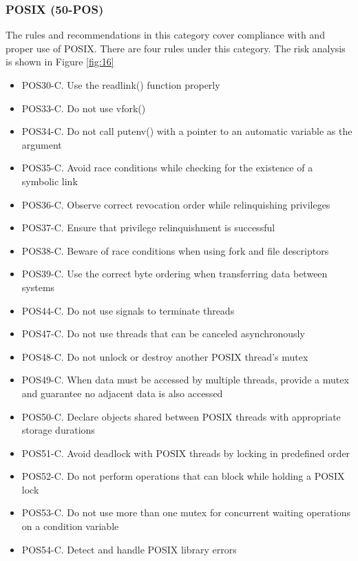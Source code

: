 \subsubsection{POSIX (50-POS)} The rules and recommendations in this category cover compliance with and proper use of POSIX. There are four rules under this category. The risk analysis is shown in Figure \ref{fig:16}\cite{cert-c}
	\begin{itemize}
		\item POS30-C. Use the readlink() function properly
		
		\item POS33-C. Do not use vfork()
		
		\item POS34-C. Do not call putenv() with a pointer to an automatic variable as the argument
		
		\item POS35-C. Avoid race conditions while checking for the existence of a symbolic link
		
		\item POS36-C. Observe correct revocation order while relinquishing privileges
		
		\item POS37-C. Ensure that privilege relinquishment is successful
		
		\item POS38-C. Beware of race conditions when using fork and file descriptors
		
		\item POS39-C. Use the correct byte ordering when transferring data between systems
		
		\item POS44-C. Do not use signals to terminate threads
		
		\item POS47-C. Do not use threads that can be canceled asynchronously
		
		\item POS48-C. Do not unlock or destroy another POSIX thread's mutex
		
		\item POS49-C. When data must be accessed by multiple threads, provide a mutex and guarantee no adjacent data is also accessed
		
		\item POS50-C. Declare objects shared between POSIX threads with appropriate storage durations
		
		\item POS51-C. Avoid deadlock with POSIX threads by locking in predefined order
		
		\item POS52-C. Do not perform operations that can block while holding a POSIX lock
		
		\item POS53-C. Do not use more than one mutex for concurrent waiting operations on a condition variable
		
		\item POS54-C. Detect and handle POSIX library errors
	\end{itemize}
